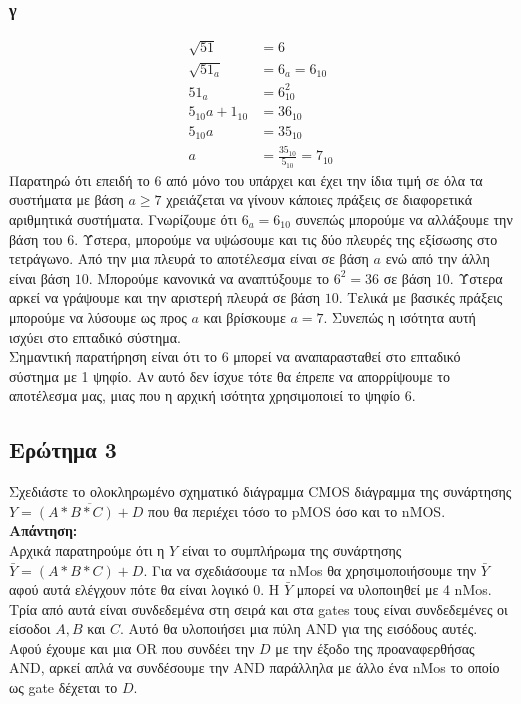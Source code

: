 \documentclass[draft]{article}
\begin{document}
\subsubsection{γ}
\begin{align*}
  \sqrt{51} &= 6 \\
  \sqrt{51_a} &= 6_a = 6_{10} \\
  51_a &= 6_{10}^2 \\
  5_{10}a + 1_{10} &= 36_{10} \\
  5_{10}a &= 35_{10} \\
  a &= \frac{35_{10}}{5_{10}} = 7_{10}
\end{align*}
Παρατηρώ ότι επειδή το $6$ από μόνο του υπάρχει και έχει την ίδια τιμή σε όλα τα συστήματα με βάση $a \ge 7$ χρειάζεται να γίνουν κάποιες πράξεις σε διαφορετικά αριθμητικά συστήματα.
Γνωρίζουμε ότι $6_a = 6_{10}$ συνεπώς μπορούμε να αλλάξουμε την βάση του $6$. Ύστερα, μπορούμε να υψώσουμε και τις δύο πλευρές της εξίσωσης στο τετράγωνο. Από την μια πλευρά το αποτέλεσμα είναι σε βάση $a$ ενώ από την άλλη είναι βάση $10$.
Μπορούμε κανονικά να αναπτύξουμε το $6^2 = 36$ σε βάση $10$. Ύστερα αρκεί να γράψουμε και την αριστερή πλευρά σε βάση $10$. Τελικά με βασικές πράξεις μπορούμε να λύσουμε ως προς $a$ και βρίσκουμε $a = 7$.
Συνεπώς η ισότητα αυτή ισχύει στο επταδικό σύστημα. \\ 
Σημαντική παρατήρηση είναι ότι το $6$ μπορεί να αναπαρασταθεί στο επταδικό σύστημα με 1 ψηφίο. Αν αυτό δεν ίσχυε τότε θα έπρεπε να απορρίψουμε το αποτέλεσμα μας, μιας που η αρχική ισότητα χρησιμοποιεί το ψηφίο $6$.

\newpage

\subsection{Ερώτημα 3}
Σχεδιάστε το ολοκληρωμένο σχηματικό διάγραμμα CMOS διάγραμμα της συνάρτησης $Y=\overline{(A * B * C) + D}$ που θα περιέχει τόσο το pMOS όσο και το nMOS. \\
\textbf{Απάντηση: } \\

Αρχικά παρατηρούμε ότι η $Y$ είναι το συμπλήρωμα της συνάρτησης $\bar{Y} = (A * B * C) + D$.
Για να σχεδιάσουμε τα nMos θα χρησιμοποιήσουμε την $\bar{Y}$ αφού αυτά ελέγχουν πότε θα είναι λογικό 0.
Η $\bar{Y}$ μπορεί να υλοποιηθεί με 4 nMos. Τρία από αυτά είναι συνδεδεμένα στη σειρά και στα gates τους είναι συνδεδεμένες οι είσοδοι $A, B$ και $C$.
Αυτό θα υλοποιήσει μια πύλη AND για της εισόδους αυτές. Αφού έχουμε και μια OR που συνδέει την $D$ με την έξοδο της προαναφερθήσας AND,
αρκεί απλά να συνδέσουμε την AND παράλληλα με άλλο ένα nMos το οποίο ως gate δέχεται το $D$.
\end{document}
